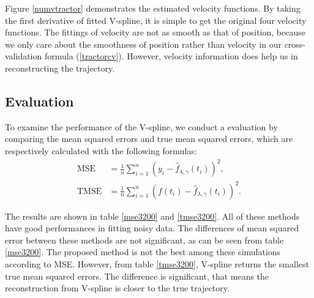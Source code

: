 Figure \ref{numvtractor} demonstrates the estimated velocity functions. By taking the first derivative of fitted V-spline, it is simple to get the original four velocity functions. The fittings of velocity are not as smooth as that of position, because we only care about the smoothness of position rather than velocity in our cross-validation formula (\ref{tractorcv}). However, velocity information does help us in reconstructing the trajectory.



\subsection{Evaluation}

To examine the performance of the V-spline, we conduct a evaluation by comparing the mean squared errors and true mean squared errors, which are respectively calculated with the following formulas: 
\begin{align}
\mbox{MSE}&= \frac{1}{n} \sum_{i=1}^{n} \left( y_i-\hat{f}_{\lambda,\gamma}(t_i) \right)^2,\\
\mbox{TMSE}&= \frac{1}{n} \sum_{i=1}^{n} \left( f(t_i)-\hat{f}_{\lambda,\gamma}(t_i) \right)^2.
\end{align}



The results are shown in table \ref{mse3200} and \ref{tmse3200}. All of these methods have good performances in fitting noisy data. The differences of mean squared error between these methods are not significant, as can be seen from table \ref{mse3200}. The proposed method is not the best among these simulations according to MSE. However, from table \ref{tmse3200}, V-spline returns the smallest true mean squared errors. The difference is significant, that means the reconstruction from V-spline is closer to the true trajectory. 
 
